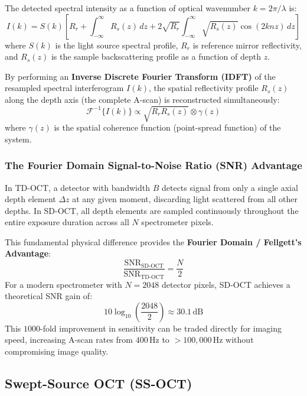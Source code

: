 \documentclass[11pt,a4paper]{article}
\begin{document}
The detected spectral intensity as a function of optical wavenumber $k = 2\pi / \lambda$ is:
\begin{equation}
    I(k) = S(k) \left[ R_r + \int_{-\infty}^{\infty} R_s(z) \, dz + 2 \sqrt{R_r} \int_{-\infty}^{\infty} \sqrt{R_s(z)} \cos(2 k n z) \, dz \right]
\end{equation}
where $S(k)$ is the light source spectral profile, $R_r$ is reference mirror reflectivity, and $R_s(z)$ is the sample backscattering profile as a function of depth $z$.

By performing an \textbf{Inverse Discrete Fourier Transform (IDFT)} of the resampled spectral interferogram $I(k)$, the spatial reflectivity profile $R_s(z)$ along the depth axis (the complete A-scan) is reconstructed simultaneously:
\begin{equation}
    \mathcal{F}^{-1} \{ I(k) \} \propto \sqrt{R_r R_s(z)} \otimes \gamma(z)
\end{equation}
where $\gamma(z)$ is the spatial coherence function (point-spread function) of the system.

\subsubsection{The Fourier Domain Signal-to-Noise Ratio (SNR) Advantage}
In TD-OCT, a detector with bandwidth $B$ detects signal from only a single axial depth element $\Delta z$ at any given moment, discarding light scattered from all other depths. In SD-OCT, all depth elements are sampled continuously throughout the entire exposure duration across all $N$ spectrometer pixels.

This fundamental physical difference provides the \textbf{Fourier Domain / Fellgett's Advantage}:
\begin{equation}
    \frac{\text{SNR}_{\text{SD-OCT}}}{\text{SNR}_{\text{TD-OCT}}} = \frac{N}{2}
\end{equation}
For a modern spectrometer with $N = 2048$ detector pixels, SD-OCT achieves a theoretical SNR gain of:
\begin{equation}
    10 \log_{10} \left( \frac{2048}{2} \right) \approx 30.1\,\text{dB}
\end{equation}
This $1000$-fold improvement in sensitivity can be traded directly for imaging speed, increasing A-scan rates from $400\,\text{Hz}$ to $> 100,000\,\text{Hz}$ without compromising image quality.

\subsection{Swept-Source OCT (SS-OCT)}
\end{document}
